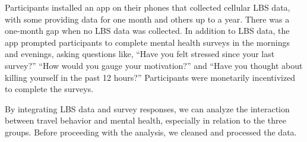 \documentclass[
  letterpaper,
  number,
  review,
  3p]{elsarticle}
\begin{document}
\begin{table}

\caption{\label{tbl-descriptivestats}Descriptive Statistics by Group:
Age, IQ Score, Sex, and Race}


\end{table}%

Participants installed an app on their phones that collected cellular
LBS data, with some providing data for one month and others up to a
year. There was a one-month gap when no LBS data was collected. In
addition to LBS data, the app prompted participants to complete mental
health surveys in the mornings and evenings, asking questions like,
``Have you felt stressed since your last survey?'' ``How would you gauge
your motivation?'' and ``Have you thought about killing yourself in the
past 12 hours?'' Participants were monetarily incentivized to complete
the surveys.

By integrating LBS data and survey responses, we can analyze the
interaction between travel behavior and mental health, especially in
relation to the three groups. Before proceeding with the analysis, we
cleaned and processed the data.
\end{document}
